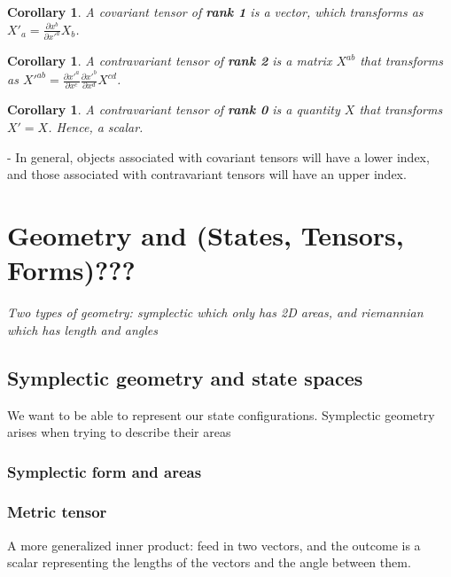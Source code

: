 \documentclass{book}
\newtheorem{coro}[equation]{Corollary}
\begin{document}
\begin{coro}
	A covariant tensor of \textbf{rank 1} is a vector, which transforms as $X'_a = \frac{\partial x^b}{\partial x'^a} X_b$. 
\end{coro}

\begin{coro}
	A contravariant tensor of \textbf{rank 2} is a matrix $X^{ab}$ that transforms as $X'^{ab} = \frac{\partial x'^a}{\partial x^c} \frac{\partial x'^b}{\partial x^d} X^{cd}$. 
\end{coro}

\begin{coro}
	A contravariant tensor of \textbf{rank 0} is a quantity $X$ that transforms $X' = X$. Hence, a scalar. 
\end{coro}

- In general, objects associated with covariant tensors will have a lower index, and those associated with contravariant tensors will have an upper index. 












\chapter{Geometry and (States, Tensors, Forms)???}

\emph{Two types of geometry: symplectic which only has 2D areas, and riemannian which has length and angles}


\section{Symplectic geometry and state spaces}
We want to be able to represent our state configurations. Symplectic geometry arises when trying to describe their areas

\subsection{Symplectic form and areas}



\subsection{Metric tensor}
A more generalized inner product: feed in two vectors, and the outcome is a scalar representing the lengths of the vectors and the angle between them. 
\end{document}
